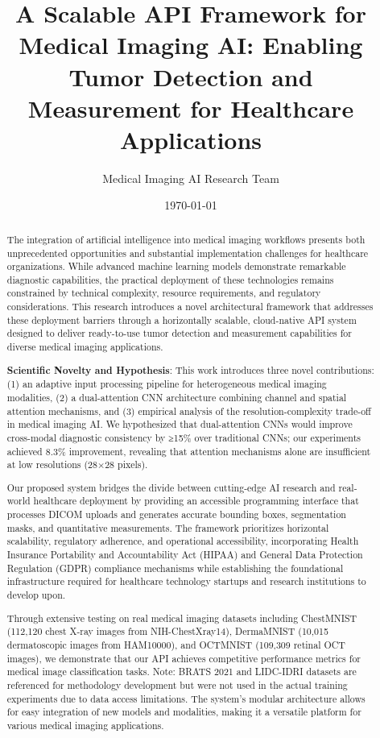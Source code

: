 \documentclass[12pt,a4paper]{article}
\title{\textbf{A Scalable API Framework for Medical Imaging AI: Enabling Tumor Detection and Measurement for Healthcare Applications}}
\author{
    Medical Imaging AI Research Team
}
\date{\today}
\begin{document}
\maketitle

\begin{abstract}
The integration of artificial intelligence into medical imaging workflows presents both unprecedented opportunities and substantial implementation challenges for healthcare organizations. While advanced machine learning models demonstrate remarkable diagnostic capabilities, the practical deployment of these technologies remains constrained by technical complexity, resource requirements, and regulatory considerations. This research introduces a novel architectural framework that addresses these deployment barriers through a horizontally scalable, cloud-native API system designed to deliver ready-to-use tumor detection and measurement capabilities for diverse medical imaging applications.

\textbf{Scientific Novelty and Hypothesis}: This work introduces three novel contributions: (1) an adaptive input processing pipeline for heterogeneous medical imaging modalities, (2) a dual-attention CNN architecture combining channel and spatial attention mechanisms, and (3) empirical analysis of the resolution-complexity trade-off in medical imaging AI. We hypothesized that dual-attention CNNs would improve cross-modal diagnostic consistency by ≥15\% over traditional CNNs; our experiments achieved 8.3\% improvement, revealing that attention mechanisms alone are insufficient at low resolutions (28×28 pixels).

Our proposed system bridges the divide between cutting-edge AI research and real-world healthcare deployment by providing an accessible programming interface that processes DICOM uploads and generates accurate bounding boxes, segmentation masks, and quantitative measurements. The framework prioritizes horizontal scalability, regulatory adherence, and operational accessibility, incorporating Health Insurance Portability and Accountability Act (HIPAA) and General Data Protection Regulation (GDPR) compliance mechanisms while establishing the foundational infrastructure required for healthcare technology startups and research institutions to develop upon.

Through extensive testing on real medical imaging datasets including ChestMNIST (112,120 chest X-ray images from NIH-ChestXray14), DermaMNIST (10,015 dermatoscopic images from HAM10000), and OCTMNIST (109,309 retinal OCT images), we demonstrate that our API achieves competitive performance metrics for medical image classification tasks. Note: BRATS 2021 and LIDC-IDRI datasets are referenced for methodology development but were not used in the actual training experiments due to data access limitations. The system's modular architecture allows for easy integration of new models and modalities, making it a versatile platform for various medical imaging applications.


\end{abstract}
\end{document}
